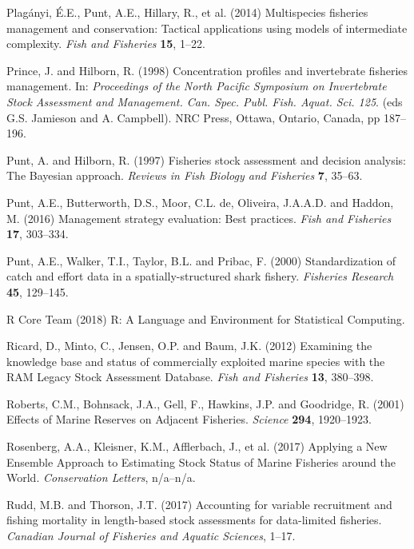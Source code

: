 \documentclass[twoside,12pt,final]{ucthesis-CA2012}
\begin{document}
\begin{ucmainmatter}
\hypertarget{ref-Plaganyi2014}{}
Plagányi, É.E., Punt, A.E., Hillary, R., et al. (2014) Multispecies
fisheries management and conservation: Tactical applications using
models of intermediate complexity. \emph{Fish and Fisheries}
\textbf{15}, 1--22.

\hypertarget{ref-Prince1998}{}
Prince, J. and Hilborn, R. (1998) Concentration profiles and
invertebrate fisheries management. In: \emph{Proceedings of the North
Pacific Symposium on Invertebrate Stock Assessment and Management. Can.
Spec. Publ. Fish. Aquat. Sci. 125}. (eds G.S. Jamieson and A. Campbell).
NRC Press, Ottawa, Ontario, Canada, pp 187--196.

\hypertarget{ref-Punt1997}{}
Punt, A. and Hilborn, R. (1997) Fisheries stock assessment and decision
analysis: The Bayesian approach. \emph{Reviews in Fish Biology and
Fisheries} \textbf{7}, 35--63.

\hypertarget{ref-Punt2016a}{}
Punt, A.E., Butterworth, D.S., Moor, C.L. de, Oliveira, J.A.A.D. and
Haddon, M. (2016) Management strategy evaluation: Best practices.
\emph{Fish and Fisheries} \textbf{17}, 303--334.

\hypertarget{ref-Punt2000}{}
Punt, A.E., Walker, T.I., Taylor, B.L. and Pribac, F. (2000)
Standardization of catch and effort data in a spatially-structured shark
fishery. \emph{Fisheries Research} \textbf{45}, 129--145.

\hypertarget{ref-RCoreTeam2018}{}
R Core Team (2018) R: A Language and Environment for Statistical
Computing.

\hypertarget{ref-Ricard2012}{}
Ricard, D., Minto, C., Jensen, O.P. and Baum, J.K. (2012) Examining the
knowledge base and status of commercially exploited marine species with
the RAM Legacy Stock Assessment Database. \emph{Fish and Fisheries}
\textbf{13}, 380--398.

\hypertarget{ref-Roberts2001}{}
Roberts, C.M., Bohnsack, J.A., Gell, F., Hawkins, J.P. and Goodridge, R.
(2001) Effects of Marine Reserves on Adjacent Fisheries. \emph{Science}
\textbf{294}, 1920--1923.

\hypertarget{ref-Rosenberg2017}{}
Rosenberg, A.A., Kleisner, K.M., Afflerbach, J., et al. (2017) Applying
a New Ensemble Approach to Estimating Stock Status of Marine Fisheries
around the World. \emph{Conservation Letters}, n/a--n/a.

\hypertarget{ref-Rudd2017}{}
Rudd, M.B. and Thorson, J.T. (2017) Accounting for variable recruitment
and fishing mortality in length-based stock assessments for data-limited
fisheries. \emph{Canadian Journal of Fisheries and Aquatic Sciences},
1--17.


\end{ucmainmatter}
\end{document}
